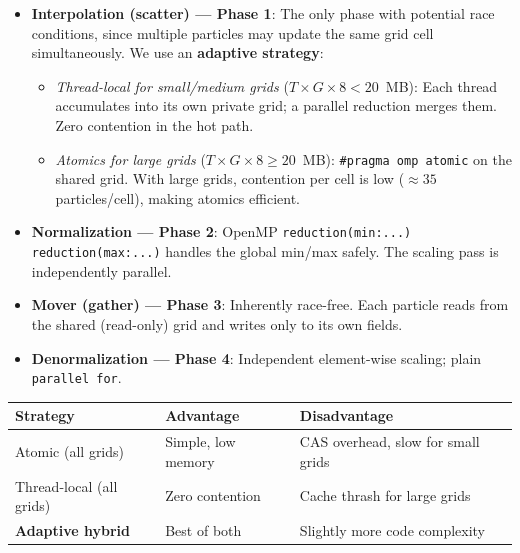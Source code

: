 \documentclass[12pt,a4paper]{article}
\begin{document}
\begin{itemize}
    \item \textbf{Interpolation (scatter) --- Phase 1}: The only phase with potential race
          conditions, since multiple particles may update the same grid cell simultaneously.
          We use an \textbf{adaptive strategy}:
          \begin{itemize}
              \item \textit{Thread-local for small/medium grids} ($T \times G \times 8 < 20$~MB):
                    Each thread accumulates into its own private grid; a parallel reduction
                    merges them. Zero contention in the hot path.
              \item \textit{Atomics for large grids} ($T \times G \times 8 \geq 20$~MB):
                    \texttt{\#pragma omp atomic} on the shared grid. With large grids,
                    contention per cell is low ($\approx\!35$ particles/cell), making atomics
                    efficient.
          \end{itemize}

    \item \textbf{Normalization --- Phase 2}: OpenMP \texttt{reduction(min:...) reduction(max:...)}
          handles the global min/max safely. The scaling pass is independently parallel.

    \item \textbf{Mover (gather) --- Phase 3}: Inherently race-free. Each particle reads
          from the shared (read-only) grid and writes only to its own fields.

    \item \textbf{Denormalization --- Phase 4}: Independent element-wise scaling; plain
          \texttt{parallel for}.
\end{itemize}

\begin{table}[H]
\centering
\begin{tabular}{lll}
\toprule
\textbf{Strategy} & \textbf{Advantage} & \textbf{Disadvantage} \\
\midrule
Atomic (all grids)      & Simple, low memory & CAS overhead, slow for small grids \\
Thread-local (all grids) & Zero contention   & Cache thrash for large grids \\
\textbf{Adaptive hybrid} & Best of both      & Slightly more code complexity \\
\bottomrule
\end{tabular}
\end{table}
\end{document}
